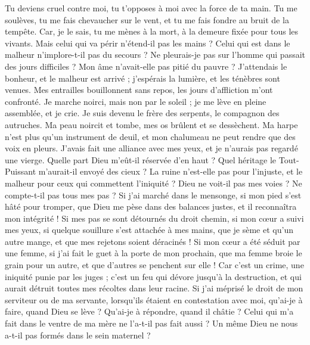 \begin{multicols}{2}
Tu deviens cruel contre moi, tu t'opposes à moi avec la force de ta main.
Tu me soulèves, tu me fais chevaucher sur le vent, et tu me fais fondre au bruit de la tempête.
Car, je le sais, tu me mènes à la mort, à la demeure fixée pour tous les vivants.
Mais celui qui va périr n'étend-il pas les mains ? Celui qui est dans le malheur n'implore-t-il pas du secours ?
Ne pleurais-je pas sur l'homme qui passait des jours difficiles ? Mon âme n'avait-elle pas pitié du pauvre ?
J'attendais le bonheur, et le malheur est arrivé ; j'espérais la lumière, et les ténèbres sont venues.
Mes entrailles bouillonnent sans repos, les jours d'affliction m'ont confronté.
Je marche noirci, mais non par le soleil ; je me lève en pleine assemblée, et je crie.
Je suis devenu le frère des serpents, le compagnon des autruches.
Ma peau noircit et tombe, mes os brûlent et se dessèchent.
Ma harpe n'est plus qu'un instrument de deuil, et mon chalumeau ne peut rendre que des voix en pleurs.
\VerseOne{}J'avais fait une alliance avec mes yeux, et je n'aurais pas regardé une vierge.
Quelle part Dieu m'eût-il réservée d'en haut ? Quel héritage le Tout-Puissant m'aurait-il envoyé des cieux ?
La ruine n'est-elle pas pour l'injuste, et le malheur pour ceux qui commettent l'iniquité ?
Dieu ne voit-il pas mes voies ? Ne compte-t-il pas tous mes pas ?
Si j'ai marché dans le mensonge, si mon pied s'est hâté pour tromper,
que Dieu me pèse dans des balances justes, et il reconnaîtra mon intégrité !
Si mes pas se sont détournés du droit chemin, si mon cœur a suivi mes yeux, si quelque souillure s'est attachée à mes mains,
que je sème et qu'un autre mange, et que mes rejetons soient déracinés !
Si mon cœur a été séduit par une femme, si j'ai fait le guet à la porte de mon prochain,
que ma femme broie le grain pour un autre, et que d'autres se penchent sur elle !
Car c'est un crime, une iniquité punie par les juges ;
c'est un feu qui dévore jusqu'à la destruction, et qui aurait détruit toutes mes récoltes dans leur racine.
Si j'ai méprisé le droit de mon serviteur ou de ma servante, lorsqu'ils étaient en contestation avec moi,
qu'ai-je à faire, quand Dieu se lève ? Qu'ai-je à répondre, quand il châtie ?
Celui qui m'a fait dans le ventre de ma mère ne l'a-t-il pas fait aussi ? Un même Dieu ne nous a-t-il pas formés dans le sein maternel ?

\end{multicols}
